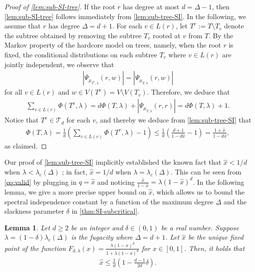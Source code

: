 \documentclass[11pt]{article}
\theoremstyle{plain}
\newtheorem{lemma}[theorem]{Lemma}
\theoremstyle{definition}
\theoremstyle{remark}
\newcommand{\TT}{\mathcal{T}}
\newcommand{\tuple}[1]{\left(#1\right)}
\newcommand{\tp}{\tuple}
\begin{document}
\begin{proof}[Proof of \cref{lem:sub-SI-tree}]
	If the root $r$ has degree at most $d=\Delta-1$, then \cref{lem:sub-SI-tree} follows immediately from \cref{lem:sub-tree-SI}.
	In the following, we assume that $r$ has degree $\Delta=d+1$.
	For each $v \in L(r)$, let $T^v := T \setminus T_v$ denote the subtree obtained by removing the subtree $T_v$ rooted at $v$ from $T$.
	By the Markov property of the hardcore model on trees, namely, when the root $r$ is fixed, the conditional distributions on each subtree $T_v$ where $v \in L(r)$ are jointly independent,
	we observe that
	\begin{align*}
		\left| \Psi_{\mu_{T^v,\lambda}}(r,w) \right| = \left| \Psi_{\mu_{T,\lambda}}(r,w) \right|
	\end{align*}
	for all $v \in L(r)$ and $w \in V(T^v) = V \setminus V(T_v)$.
	Therefore, we deduce that
	\begin{align*}
		\sum_{v \in L(r)} \Phi(T^v,\lambda) = d \Phi(T,\lambda) + \left| \Psi_{\mu_{T,\lambda}}(r,r) \right|
		= d \Phi(T,\lambda) + 1.
	\end{align*}
	Notice that $T^v \in \TT_d$ for each $v$, and thereby we deduce from \cref{lem:sub-tree-SI} that
	\begin{align*}
		\Phi(T,\lambda) = \frac{1}{d} \left( \sum_{v \in L(r)} \Phi(T^v,\lambda) - 1 \right) \le \frac{1}{d} \left( \frac{d+1}{1-d\hat{x}} - 1 \right) = \frac{1+\hat{x}}{1-d\hat{x}},
	\end{align*}
	as claimed.
\end{proof}

Our proof of \cref{lem:sub-tree-SI} implicitly established the known fact that $\hat{x} < 1/d$ when $\lambda < \lambda_c(\Delta)$ \cite{li2013correlation}; in fact, $\hat{x} = 1/d$ when $\lambda = \lambda_c(\Delta)$.
This can be seen from \cref{eq:valid} by plugging in $q = \hat{x}$ and noticing $\frac{\hat{x}}{1-\hat{x}} = \lambda (1-\hat{x})^d$. 
In the following lemma, we give a more precise upper bound on $\hat{x}$, which allows us to bound the spectral independence constant by a function of the maximum degree $\Delta$ and the slackness parameter $\delta$ in \cref{thm:SI-subcritical}.

\begin{lemma} \label{lem:sub-fixed}
    Let $d \ge 2$ be an integer and $\delta \in (0,1)$ be a real number. Suppose $\lambda = (1-\delta) \lambda_c(\Delta)$ is the fugacity where $\Delta = d+1$.
    Let $\hat x$ be the unique fixed point of the function $F_{d,\lambda}(x) = \frac{\lambda(1-x)^d}{1+\lambda(1-x)^d}$ for $x\in[0,1]$.
    Then, it holds that
    \begin{align*}
        \hat x\leq \frac{1}{d}\tp{1-\frac{d-1}{2d}\delta}.
    \end{align*}
\end{lemma}
\end{document}
